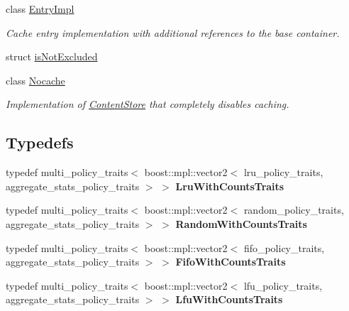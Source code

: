 \begin{DoxyCompactItemize}
class \hyperlink{classns3_1_1ndn_1_1cs_1_1EntryImpl}{Entry\+Impl}
\begin{DoxyCompactList}\small\item\em Cache entry implementation with additional references to the base container. \end{DoxyCompactList}\item 
struct \hyperlink{structns3_1_1ndn_1_1cs_1_1isNotExcluded}{is\+Not\+Excluded}
\item 
class \hyperlink{classns3_1_1ndn_1_1cs_1_1Nocache}{Nocache}
\begin{DoxyCompactList}\small\item\em Implementation of \hyperlink{classns3_1_1ndn_1_1ContentStore}{Content\+Store} that completely disables caching. \end{DoxyCompactList}\end{DoxyCompactItemize}
\subsection*{Typedefs}
\begin{DoxyCompactItemize}
\item 
typedef multi\+\_\+policy\+\_\+traits$<$ boost\+::mpl\+::vector2$<$ lru\+\_\+policy\+\_\+traits, aggregate\+\_\+stats\+\_\+policy\+\_\+traits $>$ $>$ {\bfseries Lru\+With\+Counts\+Traits}\hypertarget{namespacens3_1_1ndn_1_1cs_a63e5d6cf7a6ecdb1a6c2bc97bd067131}{}\label{namespacens3_1_1ndn_1_1cs_a63e5d6cf7a6ecdb1a6c2bc97bd067131}

\item 
typedef multi\+\_\+policy\+\_\+traits$<$ boost\+::mpl\+::vector2$<$ random\+\_\+policy\+\_\+traits, aggregate\+\_\+stats\+\_\+policy\+\_\+traits $>$ $>$ {\bfseries Random\+With\+Counts\+Traits}\hypertarget{namespacens3_1_1ndn_1_1cs_a995b90947a82b292c2a65df2225d0d77}{}\label{namespacens3_1_1ndn_1_1cs_a995b90947a82b292c2a65df2225d0d77}

\item 
typedef multi\+\_\+policy\+\_\+traits$<$ boost\+::mpl\+::vector2$<$ fifo\+\_\+policy\+\_\+traits, aggregate\+\_\+stats\+\_\+policy\+\_\+traits $>$ $>$ {\bfseries Fifo\+With\+Counts\+Traits}\hypertarget{namespacens3_1_1ndn_1_1cs_a75be30c6385103ea00c1ef5d4cf75ff8}{}\label{namespacens3_1_1ndn_1_1cs_a75be30c6385103ea00c1ef5d4cf75ff8}

\item 
typedef multi\+\_\+policy\+\_\+traits$<$ boost\+::mpl\+::vector2$<$ lfu\+\_\+policy\+\_\+traits, aggregate\+\_\+stats\+\_\+policy\+\_\+traits $>$ $>$ {\bfseries Lfu\+With\+Counts\+Traits}\hypertarget{namespacens3_1_1ndn_1_1cs_a8046ac7c514f1a9009fa8d0fa82905f5}{}\label{namespacens3_1_1ndn_1_1cs_a8046ac7c514f1a9009fa8d0fa82905f5}

\end{DoxyCompactItemize}
